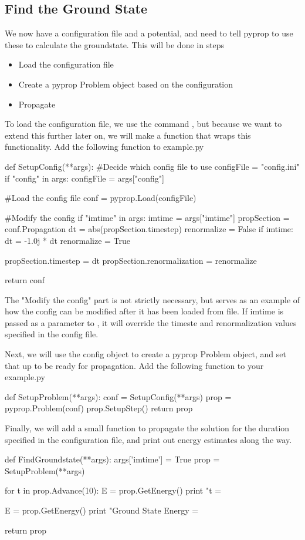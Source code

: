 \subsection{Find the Ground State}
We now have a configuration file and a potential, and need to tell pyprop to use these to calculate the groundstate. This will be done in steps
\begin{itemize}
 \item Load the configuration file 
 \item Create a pyprop Problem object based on the configuration
 \item Propagate
\end{itemize}

To load the configuration file, we use the command , but because we want to extend this further later on, we will make a function that wraps this functionality. Add the following function to example.py
\begin{python}
def SetupConfig(**args):
	#Decide which config file to use
	configFile = "config.ini"
	if "config" in args:
		configFile = args["config"]

	#Load the config file
	conf = pyprop.Load(configFile)

	#Modify the config
	if "imtime" in args:
		imtime = args["imtime"]
		propSection = conf.Propagation
		dt = abs(propSection.timestep)
		renormalize = False
		if imtime:
			dt = -1.0j * dt
			renormalize = True

		propSection.timestep = dt
		propSection.renormalization = renormalize
	
	return conf
\end{python}
The "Modify the config" part is not strictly necessary, but serves as an example of how the config can be modified after it has been loaded from file. If imtime is passed as a parameter to , it will override the timeste and renormalization values specified in the config file.

Next, we will use the config object to create a pyprop Problem object, and set that up to be ready for propagation. Add the following function to your example.py
\begin{python}
def SetupProblem(**args):
	conf = SetupConfig(**args)
	prop = pyprop.Problem(conf)
	prop.SetupStep()
	return prop
\end{python}

Finally, we will add a small function to propagate the solution for the duration specified in the configuration file, and print out
energy estimates along the way.
\begin{python}
def FindGroundstate(**args):
	args['imtime'] = True
	prop = SetupProblem(**args)
	
	for t in prop.Advance(10):
		E = prop.GetEnergy()
		print "t = %

	E = prop.GetEnergy()
	print "Ground State Energy = %

	return prop
\end{python}

